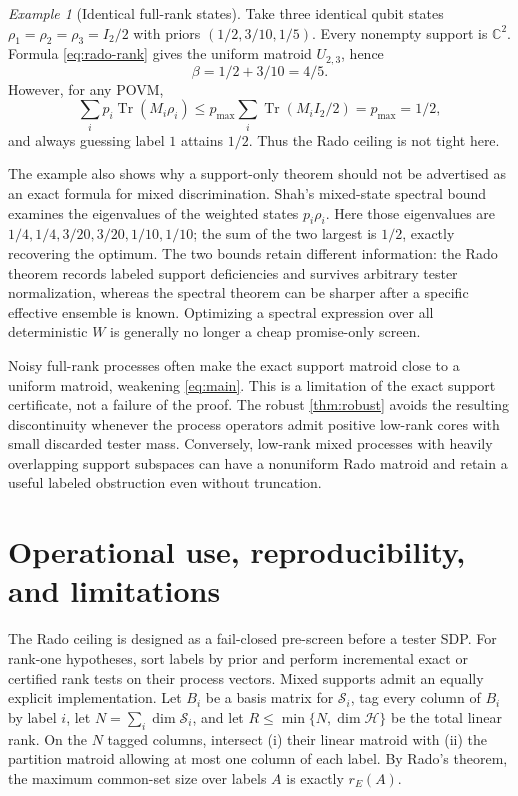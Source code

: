 \documentclass[11pt]{article}
\theoremstyle{definition}
\theoremstyle{remark}
\newtheorem{example}[theorem]{Example}
\newcommand{\C}{\mathbb C}
\newcommand{\Tr}{\operatorname{Tr}}
\newcommand{\cH}{\mathcal H}
\newcommand{\cS}{\mathcal S}
\begin{document}
\begin{example}[Identical full-rank states]\label{ex:mixed}
Take three identical qubit states
$\rho_1=\rho_2=\rho_3=I_2/2$ with priors
$(1/2,3/10,1/5)$.  Every nonempty support is $\C^2$.  Formula
\cref{eq:rado-rank} gives the uniform matroid $U_{2,3}$, hence
\[
                         \beta=1/2+3/10=4/5.
\]
However, for any POVM,
\[
 \sum_i p_i\Tr(M_i\rho_i)
 \leq p_{\max}\sum_i\Tr(M_iI_2/2)=p_{\max}=1/2,
\]
and always guessing label $1$ attains $1/2$.  Thus the Rado ceiling is not
tight here.
\end{example}

The example also shows why a support-only theorem should not be advertised as
an exact formula for mixed discrimination.  Shah's mixed-state spectral bound
~\cite{shah2025} examines the eigenvalues of the weighted states
$p_i\rho_i$.  Here those eigenvalues are
$1/4,1/4,3/20,3/20,1/10,1/10$; the sum of the two largest is $1/2$, exactly
recovering the optimum.  The two bounds retain different information: the
Rado theorem records labeled support deficiencies and survives arbitrary
tester normalization, whereas the spectral theorem can be sharper after a
specific effective ensemble is known.  Optimizing a spectral expression over
all deterministic $W$ is generally no longer a cheap promise-only screen.

Noisy full-rank processes often make the exact support matroid close to a
uniform matroid, weakening \cref{eq:main}.  This is a limitation of the exact
support certificate, not a failure of the proof.  The robust
\cref{thm:robust} avoids the resulting discontinuity whenever the process
operators admit positive low-rank cores with small discarded tester mass.
Conversely, low-rank mixed processes with heavily overlapping support
subspaces can have a nonuniform Rado matroid and retain a useful labeled
obstruction even without truncation.

\section{Operational use, reproducibility, and limitations}

The Rado ceiling is designed as a fail-closed pre-screen before a tester SDP.
For rank-one hypotheses, sort labels by prior and perform incremental exact or
certified rank tests on their process vectors.  Mixed supports admit an equally
explicit implementation.  Let $B_i$ be a basis matrix for $\cS_i$, tag every
column of $B_i$ by label $i$, let $N=\sum_i\dim\cS_i$, and let
$R\leq\min\{N,\dim\cH\}$ be the total linear rank.  On the $N$ tagged columns,
intersect (i) their linear matroid with (ii) the partition matroid allowing at
most one column of each label.  By Rado's theorem, the maximum common-set size
over labels $A$ is exactly $r_E(A)$.
\end{document}
